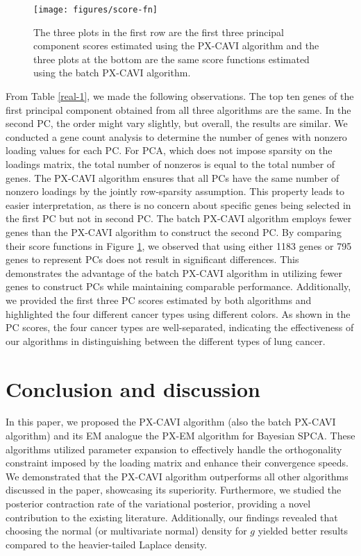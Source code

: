 \documentclass[pdftex, noinfoline, letter]{imsart}
\theoremstyle{plain}
\begin{document}
\begin{figure}[!h]
 \centering
 \caption{The three plots in the first row are the first three principal component scores estimated using the PX-CAVI algorithm and the three plots at the bottom are the same score functions estimated using the batch PX-CAVI algorithm.
}
\label{fig:real-score-fn}
\texttt{[image: figures/score-fn]}
\end{figure}

From Table \ref{real-1}, we made the following observations.
The top ten genes of the first principal component obtained from all three algorithms are the same. In the second PC, the order might vary slightly, but overall, the results are similar. We conducted a gene count analysis to determine the number of genes with nonzero loading values for each PC. For PCA, which does not impose sparsity on the loadings matrix, the total number of nonzeros is equal to the total number of genes. The PX-CAVI algorithm ensures that all PCs have the same number of nonzero loadings by the jointly row-sparsity assumption. This property leads to easier interpretation, as there is no concern about specific genes being selected in the first PC but not in second PC. The batch PX-CAVI algorithm employs fewer genes than the PX-CAVI algorithm to construct the second PC. By comparing their score functions in Figure \ref{fig:real-score-fn}, we observed that using either 1183 genes or 795 genes to represent PCs does not result in significant differences. This demonstrates the advantage of the batch PX-CAVI algorithm in utilizing fewer genes to construct PCs while maintaining comparable performance.
Additionally, we provided the first three PC scores estimated by both algorithms and highlighted the four different cancer types using different colors. As shown in the PC scores, the four cancer types are well-separated, indicating the effectiveness of our algorithms in distinguishing between the different types of lung cancer.
\section{Conclusion and discussion}
\label{sec:conclusion}


In this paper, we proposed the PX-CAVI algorithm  (also the batch PX-CAVI algorithm) and its EM analogue the PX-EM algorithm for Bayesian SPCA. These algorithms utilized parameter expansion to effectively handle the orthogonality constraint imposed by the loading matrix and enhance their convergence speeds. We demonstrated that the PX-CAVI algorithm outperforms all other algorithms discussed in the paper, showcasing its superiority. Furthermore, we studied the posterior contraction rate of the variational posterior, providing a novel contribution to the existing literature. Additionally, our findings revealed that choosing the normal (or multivariate normal) density for $g$ yielded better results compared to the heavier-tailed Laplace density.
\end{document}
